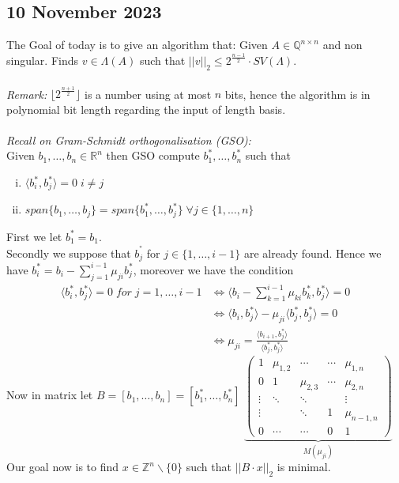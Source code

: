 \documentclass[a4paper,11pt,american]{article}
\newcommand{\Q}{\mathbb{Q}}
\newcommand{\R}{\mathbb{R}}
\newcommand{\Z}{\mathbb{Z}}
\theoremstyle{plain}
\theoremstyle{definition}
\begin{document}
\subsection*{10 November 2023}
The Goal of today is to give an algorithm that: Given $A\in \Q^{n\times n}$ and non singular. Finds $v\in \Lambda(A)$ such that $\vert\vert v\vert\vert_2\leq 2^{\frac{n-1}{2}}\cdot SV(\Lambda)$.\\\\
\emph{Remark:} $\lfloor2^{\frac{n+1}{2}}\rfloor$ is a number using at most $n$ bits, hence the algorithm is in polynomial bit length regarding the input of length basis.\\\\
\emph{Recall on Gram-Schmidt orthogonalisation (GSO):}\\
Given $b_1,\dots,b_n\in \R^n$ then GSO compute $b_1^*,\dots,b_n^*$ such that \begin{enumerate}[i)]
    \item $\langle b_i^*,b_j^*\rangle=0 \; i\neq j$
    \item $ span \{b_1,\dots,b_j\}=span\{b_1^*,\dots,b_j^*\}\; \forall j\in\{1,\dots,n\}$
\end{enumerate}
First we let $b_1^*=b_1$.\\
Secondly we suppose that $b_j^^*$ for $j\in\{1,\dots,i-1\}$ are already found. Hence we have $b_{i}^*=b_{i}-\sum_{j=1}^{i-1}\mu_{ji}b_j^*$, moreover we have the condition \begin{align*}
    \langle b_{i}^*,b^*_j\rangle=0 \; for\; j=1,\dots,i-1&\iff \langle b_{i}-\sum_{k=1}^{i-1}\mu_{ki}b_k^*,b_j^*\rangle=0\\
    &\iff \langle b_{i},b_j^*\rangle-\mu_{ji}\langle b_j^*,b_j^*\rangle=0\\
    &\iff \mu_{ji}=\frac{\langle b_{i+1},b_j^*\rangle}{\langle b_j^*,b_j^*\rangle}
\end{align*}
Now in matrix let $B=[b_1,\dots,b_n]=[b_1^*,\dots,b_n^*]$
$\underbrace{\begin{pmatrix}
    1 & \mu_{1,2} & \cdots & \cdots & \mu_{1,n} \\
    0 & 1 & \mu_{2,3} & \cdots & \mu_{2,n} \\
    \vdots & \ddots & \ddots & &  \vdots \\
     \vdots & & \ddots& 1 & \mu_{n-1, n} \\
    0 & \cdots & \cdots & 0 & 1
\end{pmatrix}}_{M(\mu_{ji})}$\\
Our goal now is to find $x\in\Z^n\backslash\{0\}$ such that $\vert\vert B\cdot x\vert\vert_2$ is minimal.\\
\end{document}
